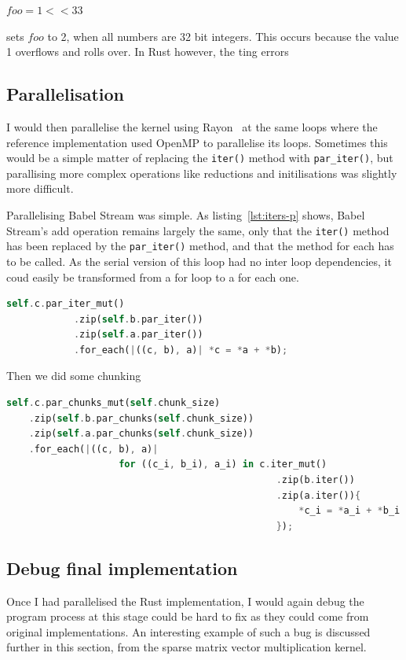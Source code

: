   $foo = 1 << 33$

sets $foo$ to 2, when all numbers are 32 bit integers. This occurs because the value 1 overflows and rolls over. In Rust however, the ting errors

\subsection{Parallelisation}
I would then parallelise the kernel using Rayon~\cite{RustRayon} at the same loops where the reference implementation used OpenMP to parallelise its loops. Sometimes this would be a simple matter of replacing the \texttt{iter()} method with \texttt{par\_iter()}, but parallising more complex operations like reductions and initilisations was slightly more difficult.

Parallelising Babel Stream was simple. As listing~\ref{lst:iters-p} shows, Babel Stream's add operation remains largely the same, only that the \texttt{iter()} method has been replaced by the \texttt{par\_iter()} method, and that the method for each has to be called. As the serial version of this loop had no inter loop dependencies, it coud easily be transformed from a for loop to a for each one.
\begin{lstlisting}[language=Rust, label=lst:iters-p, caption={Babel Stream Add, parallelised}]
self.c.par_iter_mut()
            .zip(self.b.par_iter())
            .zip(self.a.par_iter())
            .for_each(|((c, b), a)| *c = *a + *b);
\end{lstlisting}

Then we did some chunking
\begin{lstlisting}[language=Rust]
self.c.par_chunks_mut(self.chunk_size)
    .zip(self.b.par_chunks(self.chunk_size))
    .zip(self.a.par_chunks(self.chunk_size))
    .for_each(|((c, b), a)|
                    for ((c_i, b_i), a_i) in c.iter_mut()
                                                .zip(b.iter())
                                                .zip(a.iter()){
                                                    *c_i = *a_i + *b_i
                                                });
\end{lstlisting}


\subsection{Debug final implementation}
Once I had parallelised the Rust implementation, I would again debug the program process at this stage could be hard to fix as they could come from original implementations. An interesting example of such a bug is discussed further in this section, from the sparse matrix vector multiplication kernel.

